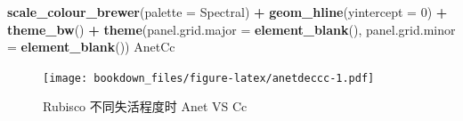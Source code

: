 \documentclass[
]{krantz}
\makeatletter
\newenvironment{Shaded}{\begin{snugshade}}{\end{snugshade}}
\newcommand{\DataTypeTok}[1]{\textcolor[rgb]{0.13,0.29,0.53}{#1}}
\newcommand{\DecValTok}[1]{\textcolor[rgb]{0.00,0.00,0.81}{#1}}
\newcommand{\KeywordTok}[1]{\textcolor[rgb]{0.13,0.29,0.53}{\textbf{#1}}}
\newcommand{\NormalTok}[1]{#1}
\newcommand{\OperatorTok}[1]{\textcolor[rgb]{0.81,0.36,0.00}{\textbf{#1}}}
\newcommand{\StringTok}[1]{\textcolor[rgb]{0.31,0.60,0.02}{#1}}
\newenvironment{kframe}{%
\medskip{}
\setlength{\fboxsep}{.8em}
 \def\at@end@of@kframe{}%
 \ifinner\ifhmode%
  \def\at@end@of@kframe{\end{minipage}}%
  \begin{minipage}{\columnwidth}%
 \fi\fi%
 \def\FrameCommand##1{\hskip\@totalleftmargin \hskip-\fboxsep
 \colorbox{shadecolor}{##1}\hskip-\fboxsep
     \hskip-\linewidth \hskip-\@totalleftmargin \hskip\columnwidth}%
 \MakeFramed {\advance\hsize-\width
   \@totalleftmargin\z@ \linewidth\hsize
   \@setminipage}}%
 {\par\unskip\endMakeFramed%
 \at@end@of@kframe}
\renewenvironment{Shaded}{\begin{kframe}}{\end{kframe}}
\makeatother
\begin{document}
\begin{Shaded}
\begin{Highlighting}[]
\StringTok{  }\KeywordTok{scale\_colour\_brewer}\NormalTok{(}\DataTypeTok{palette =} \StringTok{\textquotesingle{}Spectral\textquotesingle{}}\NormalTok{) }\OperatorTok{+}
\StringTok{  }\KeywordTok{geom\_hline}\NormalTok{(}\DataTypeTok{yintercept =} \DecValTok{0}\NormalTok{) }\OperatorTok{+}
\StringTok{  }\KeywordTok{theme\_bw}\NormalTok{() }\OperatorTok{+}
\StringTok{  }\KeywordTok{theme}\NormalTok{(}\DataTypeTok{panel.grid.major =} \KeywordTok{element\_blank}\NormalTok{(),}
        \DataTypeTok{panel.grid.minor =} \KeywordTok{element\_blank}\NormalTok{())}
\NormalTok{AnetCc}
\end{Highlighting}
\end{Shaded}

\begin{figure}
\centering
\texttt{[image: bookdown\_files/figure-latex/anetdeccc-1.pdf]}
\caption{\label{fig:anetdeccc}Rubisco 不同失活程度时 Anet VS Cc}
\end{figure}
\end{document}
